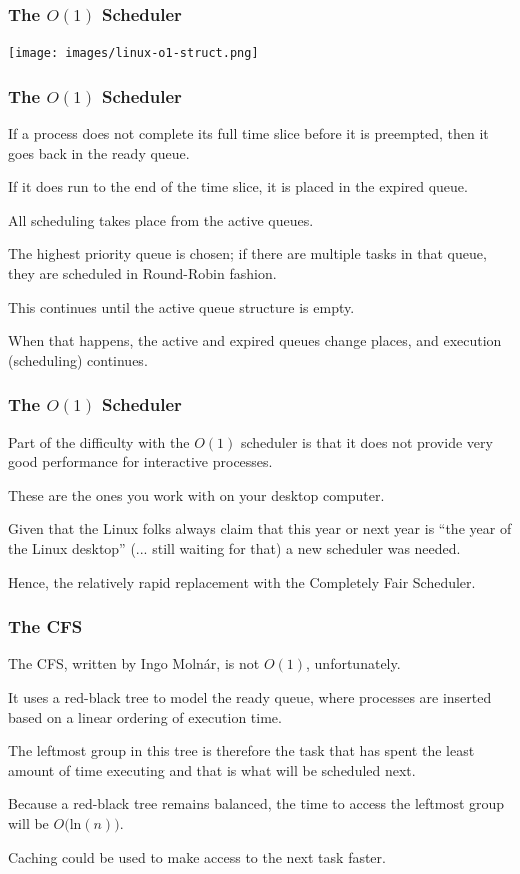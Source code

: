 \begin{frame}
\frametitle{The $O(1)$ Scheduler}


\begin{center}
	\texttt{[image: images/linux-o1-struct.png]}
\end{center}

\end{frame}

\begin{frame}
\frametitle{The $O(1)$ Scheduler}

If a process does not complete its full time slice before it is preempted, then it goes back in the ready queue. 

If it does run to the end of the time slice, it is placed in the expired queue. 

All scheduling takes place from the active queues. 

The highest priority queue is chosen; if there are multiple tasks in that queue, they are scheduled in Round-Robin fashion. 

This continues until the active queue structure is empty. 

When that happens, the active and expired queues change places, and execution (scheduling) continues.


\end{frame}

\begin{frame}
\frametitle{The $O(1)$ Scheduler}

Part of the difficulty with the $O(1)$ scheduler is that it does not provide very good performance for interactive processes.

These are the ones you work with on your desktop computer. 

Given that the Linux folks always claim that this year or next year is ``the year of the Linux desktop'' (... still waiting for that) a new scheduler was needed. 

Hence, the relatively rapid replacement with the Completely Fair Scheduler.

\end{frame}

\begin{frame}
\frametitle{The CFS}

The CFS, written by Ingo Moln\'ar, is not $O(1)$, unfortunately. 

It uses a red-black tree to model the ready queue, where processes are inserted based on a linear ordering of execution time. 

The leftmost group in this tree is therefore the task that has spent the least amount of time executing and that is what will be scheduled next. 

Because a red-black tree remains balanced, the time to access the leftmost group will be $O($ln$(n))$.

Caching could be used to make access to the next task faster.


\end{frame}

